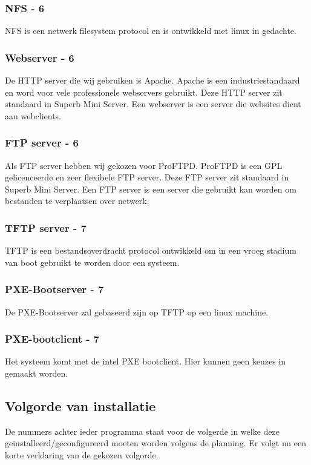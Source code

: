 \documentclass[12pt]{article}
\begin{document}
\subsubsection{NFS - 6}
NFS is een netwerk filesystem protocol en is ontwikkeld met linux in gedachte.
\subsubsection{Webserver - 6}
De HTTP server die wij gebruiken is Apache. Apache is een industriestandaard en word voor vele professionele webservers gebruikt. Deze HTTP server zit standaard in Superb Mini Server. Een webserver is een server die websites dient aan webclients.
\subsubsection{FTP server - 6}
Als FTP server hebben wij gekozen voor ProFTPD. ProFTPD is een GPL gelicenceerde en zeer flexibele FTP server. Deze FTP server zit standaard in Superb Mini Server. Een FTP server is een server die gebruikt kan worden om bestanden te verplaatsen over netwerk.
\subsubsection{TFTP server - 7}
TFTP is een bestandsoverdracht protocol ontwikkeld om in een vroeg stadium van boot gebruikt te worden door een systeem.
\subsubsection{PXE-Bootserver - 7}
De PXE-Bootserver zal gebaseerd zijn op TFTP op een linux machine.
\subsubsection{PXE-bootclient - 7}
Het systeem komt met de intel PXE bootclient. Hier kunnen geen keuzes in gemaakt worden.
\subsection{Volgorde van installatie}
De nummers achter ieder programma staat voor de volgerde in welke deze geinstalleerd/geconfigureerd moeten worden volgens de planning. Er volgt nu een korte verklaring van de gekozen volgorde.
\end{document}
